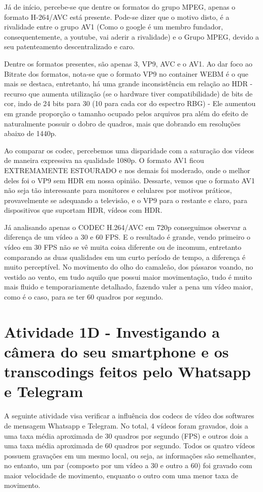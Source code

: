  \paragrafo Já de início, percebe-se que dentre os formatos do grupo MPEG, apenas o formato H-264/AVC está presente. Pode-se dizer que o motivo disto, é a rivalidade entre o grupo AV1 (Como o google é um membro fundador, consequentemente, a youtube, vai aderir a rivalidade) e o Grupo MPEG, devido a seu patenteamento descentralizado e caro.

 \paragrafo Dentre os formatos presentes, são apenas 3, VP9, AVC e o AV1. Ao dar foco ao Bitrate dos formatos, nota-se que o formato VP9 no container WEBM é o que mais se destaca, entretanto, há uma grande inconsistência em relação ao HDR - recurso que aumenta utilização (se o hardware tiver compatibilidade) de bits de cor, indo de 24 bits para 30 (10 para cada cor do espectro RBG) - Ele aumentou em grande proporção o tamanho ocupado pelos arquivos pra além do efeito de naturalmente possuir o dobro de quadros, mais que dobrando em resoluções abaixo de 1440p.

\paragrafo Ao comparar os codec, percebemos uma disparidade com a saturação dos vídeos de maneira expressiva na qualidade 1080p. O formato AV1 ficou EXTREMAMENTE ESTOURADO e nos demais foi moderado, onde o melhor deles foi o VP9 sem HDR em nossa opinião. Dessarte, vemos que o formato AV1 não seja tão interessante para monitores e celulares por motivos práticos, provavelmente se adequando a televisão, e o VP9 para o restante e claro, para dispositivos que suportam HDR, vídeos com HDR.

\paragrafo Já analisando apenas o CODEC H.264/AVC em 720p conseguimos observar a diferença de um vídeo a 30 e 60 FPS. E o resultado é grande, vendo primeiro o vídeo em 30 FPS não se vê muita coisa diferente ou de incomum, entretanto comparando as duas qualidades em um curto período de tempo, a diferença é muito perceptível. No movimento do olho do camaleão, dos pássaros voando, no vestido ao vento, em tudo aquilo que possui maior movimentação, tudo é muito mais fluido e temporariamente detalhado, fazendo valer a pena um vídeo maior, como é o caso, para se ter 60 quadros por segundo.

\section{Atividade 1D - Investigando a câmera do seu smartphone e os transcodings feitos pelo Whatsapp e Telegram}
A seguinte atividade visa verificar a influência dos codecs de vídeo dos softwares de mensagem Whatsapp e Telegram. No total, 4 vídeos foram gravados, dois a uma taxa média aproximada de 30 quadros por segundo (FPS) e outros dois a uma taxa média aproximada de 60 quadros por segundo. Todos os quatro vídeos possuem gravações em um mesmo local, ou seja, as informações são semelhantes, no entanto, um par (composto por um vídeo a 30 e outro a 60) foi gravado com maior velocidade de movimento, enquanto o outro com uma menor taxa de movimento.

